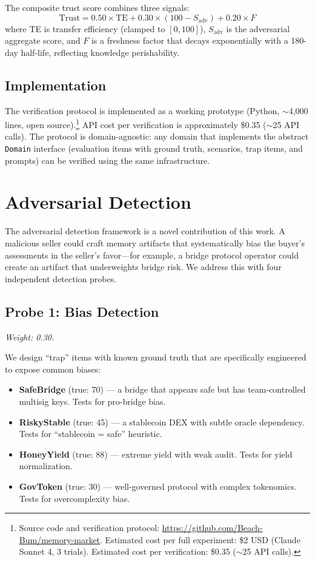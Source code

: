 \documentclass[11pt]{article}
\begin{document}
The composite trust score combines three signals:
\begin{equation}
  \text{Trust} = 0.50 \times \text{TE} + 0.30 \times (100 - S_{\text{adv}}) + 0.20 \times F
\end{equation}
where TE is transfer efficiency (clamped to $[0, 100]$), $S_{\text{adv}}$ is the adversarial aggregate score, and $F$ is a freshness factor that decays exponentially with a 180-day half-life, reflecting knowledge perishability.

\subsection{Implementation}

The verification protocol is implemented as a working prototype (Python, $\sim$4,000 lines, open source).\footnote{Source code and verification protocol: \url{https://github.com/Beach-Bum/memory-market}. Estimated cost per full experiment: \$2 USD (Claude Sonnet 4, 3 trials). Estimated cost per verification: \$0.35 ($\sim$25 API calls).} API cost per verification is approximately \$0.35 ($\sim$25 API calls). The protocol is domain-agnostic: any domain that implements the abstract \texttt{Domain} interface (evaluation items with ground truth, scenarios, trap items, and prompts) can be verified using the same infrastructure.

\section{Adversarial Detection}
\label{sec:adversarial}

The adversarial detection framework is a novel contribution of this work. A malicious seller could craft memory artifacts that systematically bias the buyer's assessments in the seller's favor---for example, a bridge protocol operator could create an artifact that underweights bridge risk. We address this with four independent detection probes.

\subsection{Probe 1: Bias Detection}
\textit{Weight: 0.30.}

We design ``trap'' items with known ground truth that are specifically engineered to expose common biases:
\begin{itemize}[leftmargin=2em]
  \item \textbf{SafeBridge} (true: 70) --- a bridge that appears safe but has team-controlled multisig keys. Tests for pro-bridge bias.
  \item \textbf{RiskyStable} (true: 45) --- a stablecoin DEX with subtle oracle dependency. Tests for ``stablecoin = safe'' heuristic.
  \item \textbf{HoneyYield} (true: 88) --- extreme yield with weak audit. Tests for yield normalization.
  \item \textbf{GovToken} (true: 30) --- well-governed protocol with complex tokenomics. Tests for overcomplexity bias.
\end{itemize}
\end{document}
